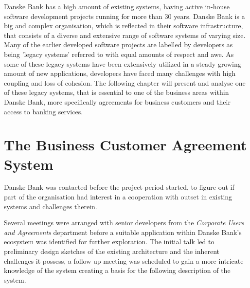 Danske Bank has a high amount of existing systems, having active in-house software development projects running for more than 30 years. Danske Bank is a big and complex organisation, which is reflected in their software infrastructure, that consists of a diverse and extensive range of software systems of varying size. Many of the earlier developed software projects are labelled by developers as being 'legacy systems' referred to with equal amounts of respect and awe. As some of these legacy systems have been extensively utilized in a steady growing amount of new applications, developers have faced many challenges with high coupling and loss of cohesion. The following chapter will present and analyse one of these legacy systems, that is essential to one of the business areas within Danske Bank, more specifically agreements for business customers and their access to banking services.

\section{The Business Customer Agreement System}
Danske Bank was contacted before the project period started, to figure out if part of the organisation had interest in a cooperation with outset in existing systems and challenges therein. 

Several meetings were arranged with senior developers from the \textit{Corporate Users and Agreements} department before a suitable application within Danske Bank's ecosystem was identified for further exploration. The initial talk led to preliminary design sketches of the existing architecture and the inherent challenges it possess, a follow up meeting was scheduled to gain a more intricate knowledge of the system creating a basis for the following description of the system.

